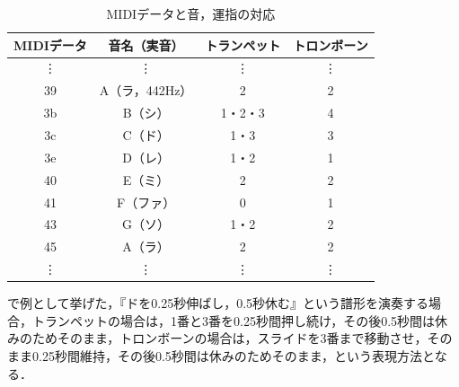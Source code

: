 \begin{table}[h]
	\centering
	\caption{MIDIデータと音，運指の対応}
	\begin{tabular}{|c|c|c|c|} \hline
		MIDIデータ & 音名（実音） & トランペット & トロンボーン \\ \hline \hline
		\vdots & \vdots & \vdots & \vdots \\ \hline
		39 & A（ラ，442Hz） & 2 & 2 \\ \hline
		3b & B（シ） & 1・2・3 & 4 \\ \hline
		3c & C（ド） & 1・3 & 3 \\ \hline
		3e & D（レ） & 1・2 & 1 \\ \hline
		40 & E（ミ） & 2 & 2 \\ \hline
		41 & F（ファ） & 0 & 1 \\ \hline
		43 & G（ソ） & 1・2 & 2 \\ \hline
		45 & A（ラ） & 2 & 2 \\ \hline
		\vdots & \vdots & \vdots & \vdots \\ \hline
	\end{tabular}
	\label{tab:map}
\end{table}

で例として挙げた，『ドを0.25秒伸ばし，0.5秒休む』という譜形を演奏する場合，トランペットの場合は，1番と3番を0.25秒間押し続け，その後0.5秒間は休みのためそのまま，トロンボーンの場合は，スライドを3番まで移動させ，そのまま0.25秒間維持，その後0.5秒間は休みのためそのまま，という表現方法となる．\\

